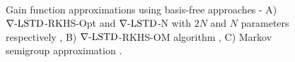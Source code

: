 \begin{figure}[htbp]
	\centering
	\mbox{
	}
	\mbox{
	}
	\mbox{
	} 
	\caption[Performance comparison of $\gradTD$-RKHS algorithms with a Gaussian kernel]{Gain function approximations using basis-free approaches - A) $\gradTD$-RKHS-Opt and $\gradTD$-N with $2N$ and $N$ parameters respectively \cite{radmey18a}, B) $\gradTD$-RKHS-OM algorithm \cite{radmey19}, C) Markov semigroup approximation \cite{tagmeh16}.}
	\label{fig:diff_td_rkhs_coif}
\end{figure}
